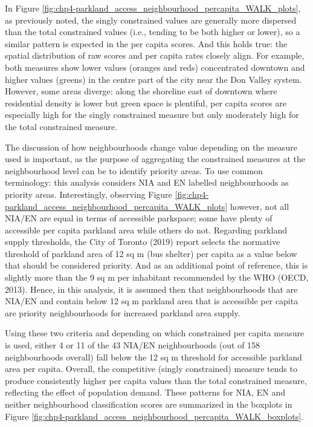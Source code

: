 \documentclass[
11pt, %
oneside, %
english, %
singlespacing, %
]{macthesis} %
\begin{document}
In Figure \ref{fig:chp4-parkland_access_neighbourhood_percapita_WALK_plots}, as previously noted, the singly constrained values are generally more dispersed than the total constrained values (i.e., tending to be both higher or lower), so a similar pattern is expected in the per capita scores. And this holds true: the spatial distribution of raw scores and per capita rates closely align. For example, both measures show lower values (oranges and reds) concentrated downtown and higher values (greens) in the centre part of the city near the Don Valley system. However, some areas diverge: along the shoreline east of downtown where residential density is lower but green space is plentiful, per capita scores are especially high for the singly constrained measure but only moderately high for the total constrained measure.

The discussion of how neighbourhoods change value depending on the measure used is important, as the purpose of aggregating the constrained measures at the neighbourhood level can be to identify priority areas. To use common terminology: this analysis considers NIA and EN labelled neighbourhoods as priority areas. Interestingly, observing Figure \ref{fig:chp4-parkland_access_neighbourhood_percapita_WALK_plots} however, not all NIA/EN are equal in terms of accessible parkspace; some have plenty of accessible per capita parkland area while others do not. Regarding parkland supply thresholds, the City of Toronto (2019) report selects the normative threshold of parkland area of 12 sq m (bus shelter) per capita as a value below that should be considered priority. And as an additional point of reference, this is slightly more than the 9 sq m per inhabitant recommended by the WHO (OECD, 2013). Hence, in this analysis, it is assumed then that neighbourhoods that are NIA/EN and contain below 12 sq m parkland area that is accessible per capita are priority neighbourhoods for increased parkland area supply.

Using these two criteria and depending on which constrained per capita measure is used, either 4 or 11 of the 43 NIA/EN neighbourhoods (out of 158 neighbourhoods overall) fall below the 12 sq m threshold for accessible parkland area per capita. Overall, the competitive (singly constrained) measure tends to produce consistently higher per capita values than the total constrained measure, reflecting the effect of population demand. These patterns for NIA, EN and neither neighbourhood classification scores are summarized in the boxplots in Figure \ref{fig:chp4-parkland_access_neighbourhood_percapita_WALK_boxplots}.
\end{document}
